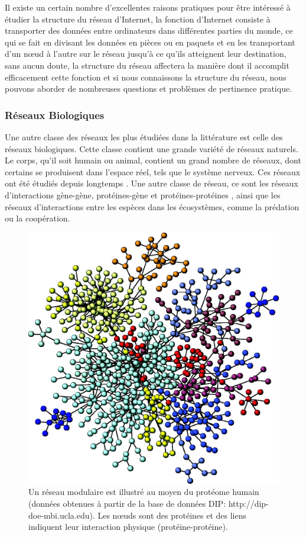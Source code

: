   Il existe un certain nombre d'excellentes raisons pratiques pour être intéressé à étudier la structure du réseau d'Internet, la fonction d'Internet consiste à transporter des données entre ordinateurs dans différentes parties du monde, ce qui se fait en divisant les données en pièces ou en paquets et en les transportant d'un nœud à l'autre sur le réseau jusqu'à ce 
  qu'ils atteignent leur destination, sans aucun doute, la structure du réseau affectera la manière dont il accomplit efficacement cette fonction et si nous connaissons la structure du réseau, nous pouvons aborder de nombreuses questions et problèmes de pertinence pratique.
  
  
  \subsubsection{Réseaux Biologiques}
  Une autre classe des  réseaux les plus étudiées dans la littérature est celle des réseaux biologiques. Cette classe contient une grande variété de réseaux naturels. Le corps, qu'il soit humain ou animal, contient un grand nombre de réseaux, dont certains se produisent dans l'espace réel, tels que le système nerveux. Ces réseaux ont été étudiés depuis longtemps \cite{WB1997}.
  Une autre classe de réseau, ce sont les réseaux d'interactions gène-gène, protéines-gène et protéines-protéines \cite{DM2003}, ainsi que les réseaux d'interactions entre les espèces dans les écosystèmes, comme la prédation ou la coopération.\\
\begin{figure}[h!]
\centering
\includegraphics[scale=0.2]{./figures/PPI}
\caption{Un réseau modulaire est illustré au moyen du protéome humain (données obtenues à partir de la base de données DIP: http://dip-doe-mbi.ucla.edu). Les nœuds sont des protéines et des liens indiquent leur interaction physique (protéine-protéine).}
\label{PPI}
\end{figure}
